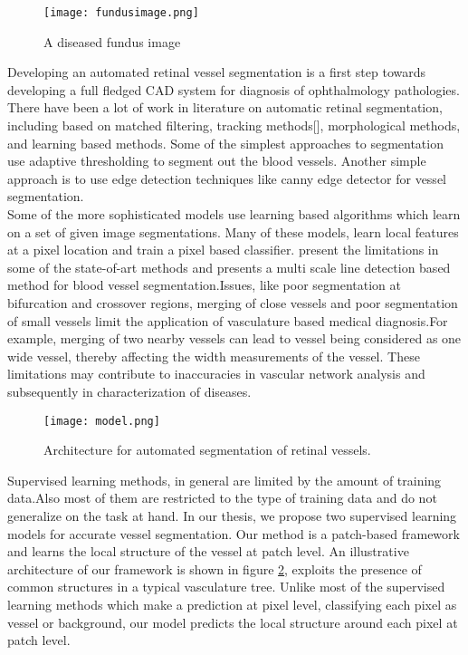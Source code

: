 \begin{figure}
	\centering	
	\texttt{[image: fundusimage.png]}
	\caption{A diseased fundus image}
	\label{fig:fundusdiseased}		
\end{figure}	

Developing an automated retinal vessel segmentation is a first step towards developing a full fledged CAD system for diagnosis of ophthalmology pathologies. There have been a lot of work in literature on automatic retinal segmentation, including based on matched filtering\cite{zana2001segmentation,hoover2000locating,al2007improved}, tracking methods[\cite{mendonca2006segmentation,chutatape1998retinal}], morphological methods\cite{leandro2001blood,walter2001segmentation}, and learning based methods\cite{sopharak2010machine,fuller2007segmentation,niemeijer2007automated}. Some of the simplest approaches to segmentation use adaptive thresholding to segment out the blood vessels\cite{jiang2003adaptive}. Another simple approach is to use edge detection techniques like canny edge detector for vessel segmentation\cite{chrastek2002optic}.\\

Some of the more sophisticated models use learning based algorithms which learn on a set of given image segmentations. Many of these models, learn local features at a pixel location and train a pixel based classifier.\citep{nguyen2011effective} present the limitations in some of the state-of-art methods and presents a multi scale line detection based method for blood vessel segmentation.Issues, like poor segmentation at bifurcation and crossover regions, merging of close vessels and poor segmentation of small vessels limit the application of vasculature based medical diagnosis.For example, merging of two nearby vessels can lead to vessel being considered as one wide vessel, thereby affecting the width measurements of the vessel. These limitations may contribute to inaccuracies in vascular network analysis and subsequently in characterization of diseases. \\

\begin{figure}
	\centering	
	\texttt{[image: model.png]}
	\caption{Architecture for automated segmentation of retinal vessels.}
	\label{fig:basicmodel}		
\end{figure}
Supervised learning methods, in general are limited by the amount of training data.Also most of them are restricted to the type of training data and do not generalize on the task at hand. In our thesis, we propose two supervised learning models for accurate vessel segmentation. Our method is a patch-based framework and learns the local structure of the vessel at patch level. An illustrative architecture of our framework is shown in figure \ref{fig:basicmodel}, exploits the presence of common structures in a typical vasculature tree. Unlike most of the supervised learning methods which make a prediction at pixel level, classifying each pixel as vessel or background, our model predicts the local structure around each pixel at patch level.


